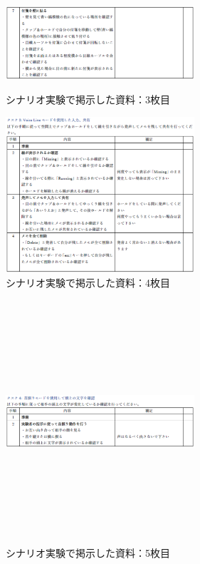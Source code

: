 \documentclass[11pt,a4j, titlepage]{jarticle} %
\begin{document}
\begin{figure}[htbp]
 \begin{minipage}{0.5\hsize}
  \begin{center}
   \includegraphics[width=70mm]{task2_2.eps}
  \end{center}
  \caption{シナリオ実験で掲示した資料：3枚目}
  \label{fig:task2_2}
 \end{minipage}
 \begin{minipage}{0.5\hsize}
  \begin{center}
   \includegraphics[width=70mm]{task3.eps}
  \end{center}
  \caption{シナリオ実験で掲示した資料：4枚目}
  \label{fig:task3}
 \end{minipage}
\end{figure}

\begin{figure}[H]
  \begin{center}
    \includegraphics[clip,height=9.0cm,width=7.0cm]{./task4.eps}
    \caption{シナリオ実験で掲示した資料：5枚目}
    \label{fig:task4}
  \end{center}
\end{figure}
\end{document}
